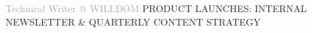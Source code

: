 \begin{cvtable}
{%
} 

{\textcolor{darkgray}{%
    Technical Writer \newline @
{W\scriptsize ILL}{D\scriptsize OM}
    }}%
{
}%
{%
{\scriptsize PRODUCT LAUNCHES:
INTERNAL NEWSLETTER \& QUARTERLY CONTENT STRATEGY
} \\
} 


\end{cvtable}
